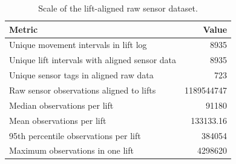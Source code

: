 \begin{table}[htbp]
    \centering
    \caption{Scale of the lift-aligned raw sensor dataset.}
    \label{tab:dataset-scale}
    \begin{tabular}{lr}
        \toprule
        Metric & Value \\
        \midrule
        Unique movement intervals in lift log & 8935 \\
        Unique lift intervals with aligned sensor data & 8935 \\
        Unique sensor tags in aligned raw data & 723 \\
        Raw sensor observations aligned to lifts & 1189544747 \\
        Median observations per lift & 91180 \\
        Mean observations per lift & 133133.16 \\
        95th percentile observations per lift & 384054 \\
        Maximum observations in one lift & 4298620 \\
        \bottomrule
    \end{tabular}
\end{table}
